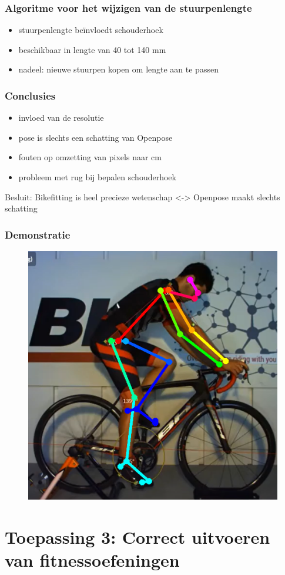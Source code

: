 \documentclass
   [kulak] %
   {kulakbeamer}
\begin{document}
\begin{frame}
	\frametitle{Algoritme voor het wijzigen van de stuurpenlengte}
	\begin{itemize}
		\item stuurpenlengte beïnvloedt schouderhoek
		\item beschikbaar in lengte van 40 tot 140 \si{mm}
		\item nadeel: nieuwe stuurpen kopen om lengte aan te passen
		
	\end{itemize}
\end{frame}

\begin{frame}
	\frametitle{Conclusies}
	\begin{itemize}
		\item invloed van de resolutie
		\item pose is slechts een schatting van Openpose
		\item fouten op omzetting van pixels naar \si{cm}
		\item probleem met rug bij bepalen schouderhoek
	\end{itemize}
Besluit: Bikefitting is heel precieze wetenschap <-> Openpose maakt slechts schatting
\end{frame}

\begin{frame}
	\frametitle{Demonstratie}
	\begin{figure}
		\includegraphics[width= .55\textwidth]{prof_bikefit}
	\end{figure}
\end{frame}



\section{Toepassing 3: Correct uitvoeren van fitnessoefeningen}
\end{document}
